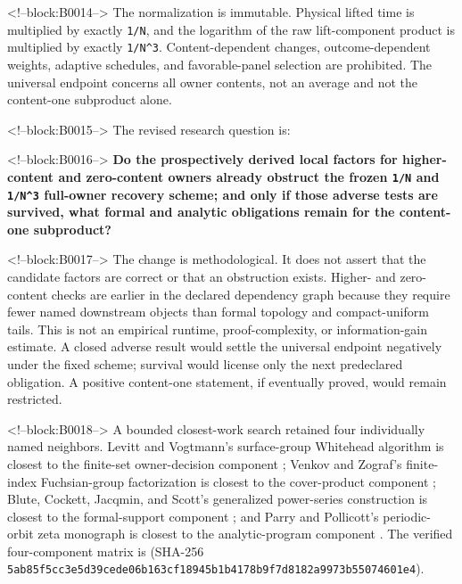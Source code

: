 \documentclass[11pt]{article}
\begin{document}
<!--block:B0014-->
The normalization is immutable. Physical lifted time is multiplied by
exactly \texttt{1/N}, and the logarithm of the raw lift-component
product is multiplied by exactly \texttt{1/N\^{}3}. Content-dependent
changes, outcome-dependent weights, adaptive schedules, and
favorable-panel selection are prohibited. The universal endpoint
concerns all owner contents, not an average and not the content-one
subproduct alone.

<!--block:B0015-->
The revised research question is:

<!--block:B0016-->
\textbf{Do the prospectively derived local factors for higher-content
and zero-content owners already obstruct the frozen \texttt{1/N} and
\texttt{1/N\^{}3} full-owner recovery scheme; and only if those adverse
tests are survived, what formal and analytic obligations remain for the
content-one subproduct?}

<!--block:B0017-->
The change is methodological. It does not assert that the candidate factors
are correct or that an obstruction exists. Higher- and zero-content checks are
earlier in the declared dependency graph because they require fewer named
downstream objects than formal topology and compact-uniform tails. This is not
an empirical runtime, proof-complexity, or information-gain estimate. A closed
adverse result would settle the universal endpoint negatively under the fixed
scheme; survival would license only the next predeclared obligation. A positive
content-one statement, if eventually proved, would remain restricted.

<!--block:B0018-->
A bounded closest-work search retained four individually named neighbors.
Levitt and Vogtmann's surface-group Whitehead algorithm is closest to the
finite-set owner-decision component \citep{P32-CW01}; Venkov and Zograf's
finite-index Fuchsian-group factorization is closest to the cover-product
component \citep{P32-CW02}; Blute, Cockett, Jacqmin, and Scott's generalized
power-series construction is closest to the formal-support component
\citep{P32-CW03}; and Parry and Pollicott's periodic-orbit zeta monograph is
closest to the analytic-program component \citep{P32-CW04}.  The verified
four-component matrix is
(SHA-256 \texttt{5ab85f5c\allowbreak{}c3e5d39c\allowbreak{}ede06b16\allowbreak{}3cf18945\allowbreak{}b1b4178b\allowbreak{}9f7d8182\allowbreak{}a9973b55\allowbreak{}074601e4}).
\end{document}
